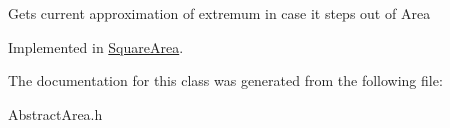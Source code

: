 Gets current approximation of extremum in case it steps out of Area 

Implemented in \hyperlink{class_square_area_afd99ae01cff4b1e31511a22e9b89b42a}{Square\+Area}.



The documentation for this class was generated from the following file\+:\begin{DoxyCompactItemize}
\item 
Abstract\+Area.\+h\end{DoxyCompactItemize}
